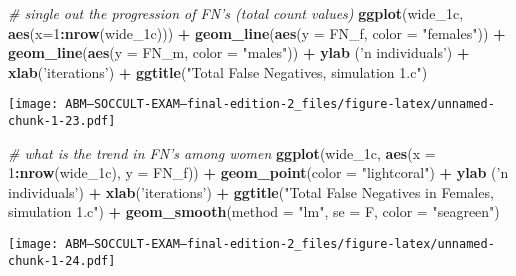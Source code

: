 \documentclass[]{article}
\newenvironment{Shaded}{\begin{snugshade}}{\end{snugshade}}
\newcommand{\KeywordTok}[1]{\textcolor[rgb]{0.13,0.29,0.53}{\textbf{#1}}}
\newcommand{\DataTypeTok}[1]{\textcolor[rgb]{0.13,0.29,0.53}{#1}}
\newcommand{\DecValTok}[1]{\textcolor[rgb]{0.00,0.00,0.81}{#1}}
\newcommand{\StringTok}[1]{\textcolor[rgb]{0.31,0.60,0.02}{#1}}
\newcommand{\CommentTok}[1]{\textcolor[rgb]{0.56,0.35,0.01}{\textit{#1}}}
\newcommand{\OperatorTok}[1]{\textcolor[rgb]{0.81,0.36,0.00}{\textbf{#1}}}
\newcommand{\NormalTok}[1]{#1}
\begin{document}
\begin{Shaded}
\begin{Highlighting}[]
\CommentTok{# single out the progression of FN's (total count values)}
\KeywordTok{ggplot}\NormalTok{(wide_1c, }\KeywordTok{aes}\NormalTok{(}\DataTypeTok{x=}\DecValTok{1}\OperatorTok{:}\KeywordTok{nrow}\NormalTok{(wide_1c))) }\OperatorTok{+}\StringTok{ }
\StringTok{  }\KeywordTok{geom_line}\NormalTok{(}\KeywordTok{aes}\NormalTok{(}\DataTypeTok{y =}\NormalTok{ FN_f, }\DataTypeTok{color =} \StringTok{"females"}\NormalTok{)) }\OperatorTok{+}
\StringTok{  }\KeywordTok{geom_line}\NormalTok{(}\KeywordTok{aes}\NormalTok{(}\DataTypeTok{y =}\NormalTok{ FN_m, }\DataTypeTok{color =} \StringTok{"males"}\NormalTok{)) }\OperatorTok{+}
\StringTok{  }\KeywordTok{ylab}\NormalTok{ (}\StringTok{'n individuals'}\NormalTok{) }\OperatorTok{+}\StringTok{ }\KeywordTok{xlab}\NormalTok{(}\StringTok{'iterations'}\NormalTok{) }\OperatorTok{+}
\StringTok{  }\KeywordTok{ggtitle}\NormalTok{(}\StringTok{"Total False Negatives, simulation 1.c"}\NormalTok{)}
\end{Highlighting}
\end{Shaded}

\texttt{[image: ABM---SOCCULT-EXAM---final-edition-2\_files/figure-latex/unnamed-chunk-1-23.pdf]}

\begin{Shaded}
\begin{Highlighting}[]
\CommentTok{# what is the trend in FN's among women}
\KeywordTok{ggplot}\NormalTok{(wide_1c, }\KeywordTok{aes}\NormalTok{(}\DataTypeTok{x =} \DecValTok{1}\OperatorTok{:}\KeywordTok{nrow}\NormalTok{(wide_1c), }\DataTypeTok{y =}\NormalTok{ FN_f)) }\OperatorTok{+}\StringTok{ }
\StringTok{  }\KeywordTok{geom_point}\NormalTok{(}\DataTypeTok{color =} \StringTok{"lightcoral"}\NormalTok{) }\OperatorTok{+}
\StringTok{  }\KeywordTok{ylab}\NormalTok{ (}\StringTok{'n individuals'}\NormalTok{) }\OperatorTok{+}\StringTok{ }\KeywordTok{xlab}\NormalTok{(}\StringTok{'iterations'}\NormalTok{) }\OperatorTok{+}
\StringTok{  }\KeywordTok{ggtitle}\NormalTok{(}\StringTok{"Total False Negatives in Females, simulation 1.c"}\NormalTok{) }\OperatorTok{+}
\StringTok{  }\KeywordTok{geom_smooth}\NormalTok{(}\DataTypeTok{method =} \StringTok{"lm"}\NormalTok{, }\DataTypeTok{se =}\NormalTok{ F, }\DataTypeTok{color =} \StringTok{"seagreen"}\NormalTok{)}
\end{Highlighting}
\end{Shaded}

\texttt{[image: ABM---SOCCULT-EXAM---final-edition-2\_files/figure-latex/unnamed-chunk-1-24.pdf]}
\end{document}
